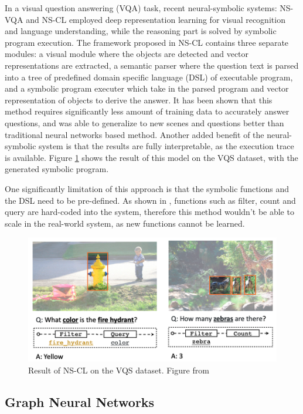 \documentclass[journal]{IEEEtran}
\begin{document}
In a visual question answering (VQA) task, recent neural-symbolic systems: NS-VQA \cite{nsvqa} and NS-CL \cite{Mao2019NeuroSymbolic} employed deep representation learning
for visual recognition and language understanding, while the reasoning part is solved by symbolic program execution.
The framework proposed in NS-CL contains three separate modules: 
a visual module where the objects are detected and vector representations are extracted, 
a semantic parser where the question text is parsed into a tree of predefined domain specific language (DSL) of executable program,
and a symbolic program executer which take in the parsed program and vector representation of objects to derive the answer. 
It has been shown that this method requires significantly less amount of training data to accurately answer questions, 
and was able to generalize to new scenes and questions better than traditional neural networks based method. 
Another added benefit of the neural-symbolic system is that the results are fully interpretable, as the execution trace is available.
Figure \ref{nscl} shows the result of this model on the VQS dataset, with the generated symbolic program.

One significantly limitation of this approach is that the symbolic functions and the DSL need to be pre-defined. 
As shown in \cite{Mao2019NeuroSymbolic}, functions such as filter, count and query are hard-coded into the system, 
therefore this method wouldn't be able to scale in the real-world system, as new functions cannot be learned.

\begin{figure}[htb]
  \includegraphics[width=\linewidth]{nscl.png}
  \caption{Result of NS-CL on the VQS dataset. Figure from \cite{Mao2019NeuroSymbolic}}
  \label{nscl}
\end{figure}

\subsection{Graph Neural Networks}
\end{document}
